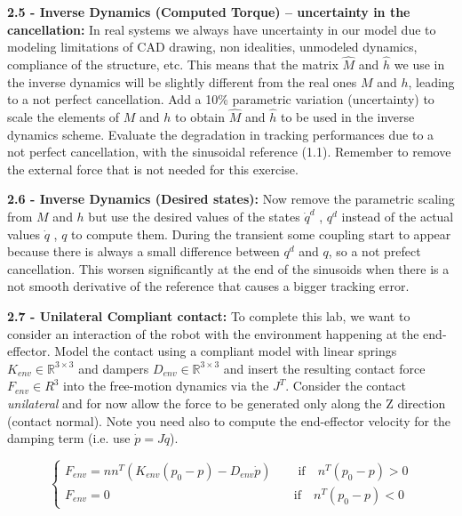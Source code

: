 \documentclass[11pt]{article}
\newcommand{\Rnum}{\mathbb{R}} %
\begin{document}
\quad

\noindent
\textbf{2.5 - Inverse Dynamics (Computed Torque) – uncertainty in the cancellation:}
%
In real systems we always have uncertainty in our model due to modeling 
limitations of  CAD  drawing, non idealities, unmodeled dynamics, compliance of the structure, etc.
This means that the matrix $\hat{M}$ and $\hat{h}$ we use in the inverse dynamics will be slightly different from the real ones ${M}$ and ${h}$, leading to a not perfect cancellation. Add a 10\%   parametric variation (uncertainty) to scale the elements of $M$ and $h$  to obtain $\hat{M}$ and $\hat{h}$  to be used in the inverse dynamics scheme. %
Evaluate the degradation in tracking performances due to a not perfect cancellation, with the sinusoidal reference (1.1). Remember to remove the external force that is not needed for this exercise.

\quad

\noindent
\textbf{ 2.6 - Inverse Dynamics (Desired states):}
Now remove  the parametric scaling from  $M$ and $h$  but use the desired values of the states $\dot{q}^d$ , $q^d$  instead of 
the actual values $\dot{q}$ , $q$ to compute them. During the transient some coupling start to appear because there is always a small difference between $q^d$ and $q$, so a not prefect cancellation. This worsen significantly at the end of the sinusoids when there is a not smooth derivative of the reference that causes a bigger tracking error.
 
\quad

\noindent 
\textbf{ 2.7 - Unilateral Compliant contact:} 
To complete this lab, we want to consider an interaction of the robot with the environment happening at the end-effector. 
Model the contact using a compliant model with linear  springs $K_{env}\in \Rnum^{3 \times 3}$ and dampers $D_{env}\in \Rnum^{3 \times 3}$  and insert the resulting contact force $F_{env} \in R^3$ into the free-motion dynamics via the $J^T$. Consider the contact \textit{unilateral} and for now allow the force to be generated only along the Z direction (contact normal).
Note you need also to compute the end-effector velocity for the damping term (i.e. use $\dot{p} = J\dot{q}$).

\begin{equation*}
\begin{cases}
	F_{env} = n n^T (K_{env}(p_0 - p) - D_{env} \dot{p}) \quad &\text{   if}\quad n^T(p_0 -p ) >0 \\ 
	F_{env} = 0     \quad &\text{if}\quad n^T(p_0 -p ) <0
\end{cases}
\end{equation*}
\end{document}
